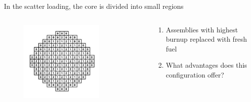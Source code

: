 \documentclass[aspectratio=1610,pdftex,dvipsnames,compress,xcolor={dvipsnames}]{beamer}
\begin{document}
\begin{frame}{In the scatter loading, the core is divided into small regions}
    \begin{columns}

        \begin{column}{0.55\textwidth}
            \begin{figure}
                \centering
                \includegraphics[width=0.75\textwidth]{core_scatter.jpg}
            \end{figure}
        \end{column}

        \begin{column}{0.45\textwidth}
            \begin{enumerate}[series=outerlist,topsep=0pt,itemsep=15pt,leftmargin=*,label=(\arabic*)]
                \item[]Assemblies with highest burnup replaced with fresh fuel
                \item[]What advantages does this configuration offer?
            \end{enumerate}
        \end{column}

    \end{columns}
\end{frame}
\end{document}
